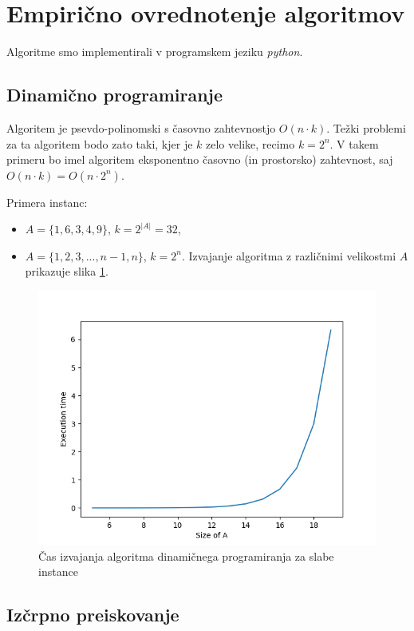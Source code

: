 \documentclass{article}
\begin{document}
\section{Empirično ovrednotenje algoritmov}

Algoritme smo implementirali v programskem jeziku \textit{python}.

\subsection{Dinamično programiranje}

Algoritem je psevdo-polinomski s časovno zahtevnostjo $O(n \cdot k)$. Težki
problemi za ta algoritem bodo zato taki, kjer je $k$ zelo velike, recimo
$k = 2^n$. V takem primeru bo imel algoritem eksponentno časovno (in prostorsko)
zahtevnost, saj $O(n \cdot k) = O(n \cdot 2^n)$.

Primera instanc:
\begin{itemize}
	\item $A = \{ 1, 6, 3, 4, 9\}$, $k = 2^{\lvert A \rvert} = 32$,
	\item $A = \{ 1, 2, 3, ..., n-1, n\}$, $k = 2^n$. Izvajanje algoritma z
	različnimi velikostmi $A$ prikazuje slika \ref{fig:dyn}.
\end{itemize}

\begin{figure}
	\centering
	\includegraphics[width=0.8\linewidth]{figs/dyn-hard.png}
	\caption{Čas izvajanja algoritma dinamičnega programiranja za slabe instance}
	\label{fig:dyn}
\end{figure}

\subsection{Izčrpno preiskovanje}
\end{document}
